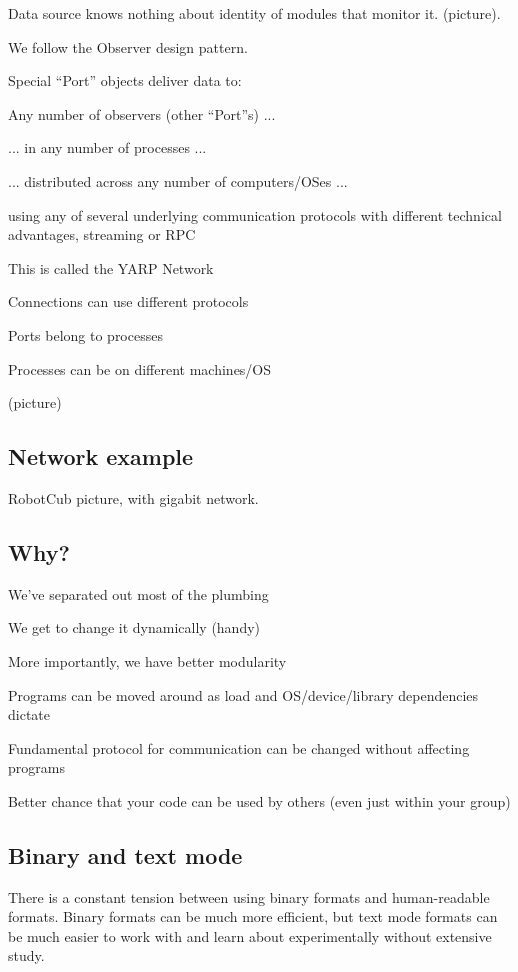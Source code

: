 Data source knows nothing about identity of modules that monitor it.
(picture).

We follow the Observer design pattern. 

Special ``Port'' objects deliver data to:

Any number of observers (other ``Port''s) ...

... in any number of processes ...

... distributed across any number of computers/OSes ...

using any of several underlying communication protocols with different
technical advantages, streaming or RPC

This is called the YARP Network

Connections can use different protocols

Ports belong to processes

Processes can be on different machines/OS

(picture)

\subsection*{Network example}

RobotCub picture, with gigabit network.

\subsection*{Why?}

We've separated out most of the plumbing

We get to change it dynamically (handy)

More importantly, we have better modularity

Programs can be moved around as load and OS/device/library
 dependencies dictate

Fundamental protocol for communication can be changed without 
affecting programs

Better chance that your code can be used by others (even just within 
your group)





\subsection{Binary and text mode}

There is a constant tension between using binary formats and
human-readable formats.  Binary formats can be much more efficient,
but text mode formats can be much easier to work with and learn about
experimentally without extensive study.

